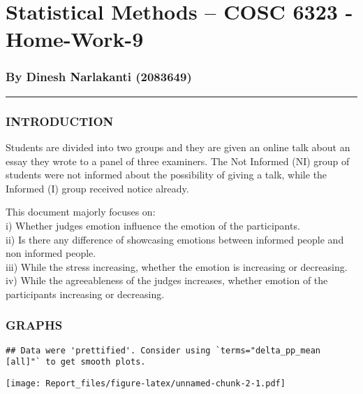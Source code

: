 \documentclass[
]{article}
\author{}
\date{\vspace{-2.5em}}
\begin{document}
\hypertarget{statistical-methods-cosc-6323---home-work-9}{%
\section{Statistical Methods -- COSC 6323 -
Home-Work-9}\label{statistical-methods-cosc-6323---home-work-9}}

\hypertarget{by-dinesh-narlakanti-2083649}{%
\subsubsection{By Dinesh Narlakanti
(2083649)}\label{by-dinesh-narlakanti-2083649}}

\begin{center}\rule{0.5\linewidth}{0.5pt}\end{center}

\hypertarget{introduction}{%
\subsubsection{INTRODUCTION}\label{introduction}}

Students are divided into two groups and they are given an online talk
about an essay they wrote to a panel of three examiners. The Not
Informed (NI) group of students were not informed about the possibility
of giving a talk, while the Informed (I) group received notice already.

This document majorly focuses on:\\
i) Whether judges emotion influence the emotion of the participants.\\
ii) Is there any difference of showcasing emotions between informed
people and non informed people.\\
iii) While the stress increasing, whether the emotion is increasing or
decreasing.\\
iv) While the agreeableness of the judges increases, whether emotion of
the participants increasing or decreasing.

\hypertarget{graphs}{%
\subsubsection{GRAPHS}\label{graphs}}

\begin{verbatim}
## Data were 'prettified'. Consider using `terms="delta_pp_mean [all]"` to get smooth plots.
\end{verbatim}

\texttt{[image: Report\_files/figure-latex/unnamed-chunk-2-1.pdf]}
\end{document}
